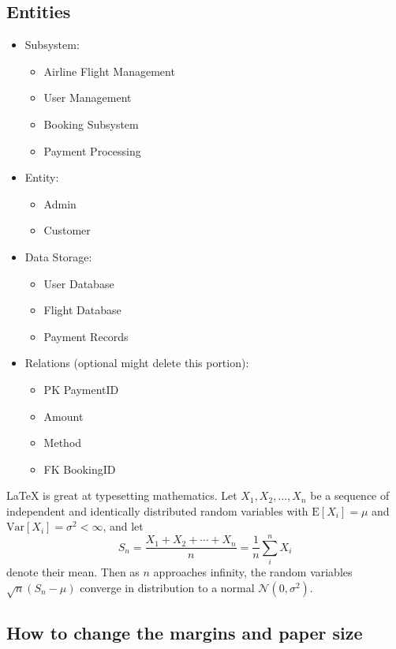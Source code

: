 \documentclass{article}
\begin{document}
\begin{itemize}
\subsection{Entities}
\begin{itemize}
\item Subsystem:
    \begin{itemize}
    \item Airline Flight Management
    \item User Management
    \item Booking Subsystem
    \item Payment Processing
    \end{itemize}
\item Entity:
    \begin{itemize}
    \item Admin
    \item Customer
    \end{itemize}
\item Data Storage:
    \begin{itemize}
    \item User Database
    \item Flight Database
    \item Payment Records
    \end{itemize}
\item Relations (optional might delete this portion):
    \begin{itemize}
    \item PK    PaymentID
    \item       Amount
    \item       Method
    \item FK    BookingID
    \end{itemize}
\end{itemize}

\LaTeX{} is great at typesetting mathematics. Let $X_1, X_2, \ldots, X_n$ be a sequence of independent and identically distributed random variables with $\text{E}[X_i] = \mu$ and $\text{Var}[X_i] = \sigma^2 < \infty$, and let
\[S_n = \frac{X_1 + X_2 + \cdots + X_n}{n}
      = \frac{1}{n}\sum_{i}^{n} X_i\]
denote their mean. Then as $n$ approaches infinity, the random variables $\sqrt{n}(S_n - \mu)$ converge in distribution to a normal $\mathcal{N}(0, \sigma^2)$.


\subsection{How to change the margins and paper size}


\end{itemize}
\end{document}
